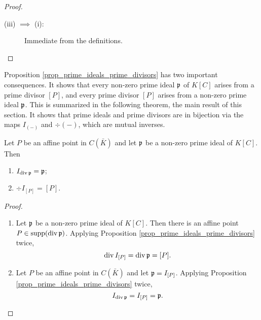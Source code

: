 \begin{proof}
\begin{description}
\begin{comment}
      Conversely, if $Q$ is not in the orbit of $P$, then $\frak p \neq I_{[Q]}$,
      so that $Q \not \in \supp(\div \frak p)$.
      By Lemma \ref{lem_order_is_1}, $P$ appears with multiplicity 1, so that $\div \frak p = [P]$.
\end{comment}
    \item [(iii) $\implies$ (i):]
      Immediate from the definitions.\qedhere
  \end{description}
\end{proof}

Proposition \ref{prop_prime_ideals_prime_divisors} has two important consequences.
It shows that every non-zero prime ideal $\frak p$ of $K[C]$ arises from a prime divisor $[P]$,
and every prime divisor $[P]$ arises from a non-zero prime ideal $\frak p$.
This is summarized in the following theorem, the main result of this section.
It shows that prime ideals and prime divisors are in bijection
via the maps $I_{(-)}$ and $\div(-)$, which are mutual inverses.

\begin{theorem}
  \label{thm_prime_ideals_and_divisors}
  Let $P$ be an affine point in $C(\bar K)$ and let $\frak p$ be a non-zero prime ideal of $K[C]$. Then
  \begin{enumerate}[label=(\roman*)]
    \item $I_{\div \frak p} = \frak p$;
    \item $\div I_{[P]} = [P]$.
  \end{enumerate}
\end{theorem}
\begin{proof}
  \begin{enumerate}[label=(\roman*)]
    \item
      Let $\frak p$ be a non-zero prime ideal of $K[C]$.
      Then there is an affine point $P \in \supp(\div \frak p)$.
      Applying Proposition \ref{prop_prime_ideals_prime_divisors} twice,
      \[ \div I_{[P]} = \div \frak p = [P]. \]
    
    \item
      Let $P$ be an affine point in $C(\bar K)$ and let $\frak p = I_{[P]}$.
      Applying Proposition \ref{prop_prime_ideals_prime_divisors} twice,
      \[ I_{\div \frak p} = I_{[P]} = \frak p. \]
  \end{enumerate}
\end{proof}




